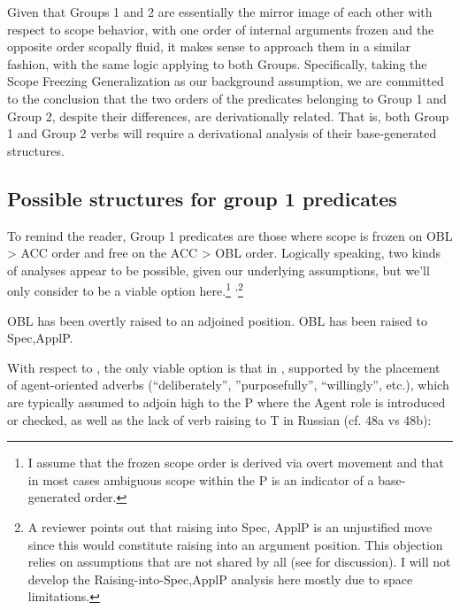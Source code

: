 \documentclass[output=paper,colorlinks,citecolor=brown,modfonts,nonflat]{langsci/langscibook}
\begin{document}
Given that Groups 1 and 2 are essentially the mirror image of each other with respect to scope behavior, with one order of internal arguments frozen and the opposite order scopally fluid, it makes sense to approach them in a similar fashion, with the same logic applying to both Groups. Specifically, taking the Scope Freezing Generalization as our background assumption, we are committed to the conclusion that the two orders of the predicates belonging to Group 1 and Group 2, despite their differences, are derivationally related. That is, both Group 1 and Group 2 verbs will require a derivational analysis of their base-generated structures.

\subsection{Possible structures for group 1 predicates}\label{sec:antonyuk:4.1}

To remind the reader, Group 1 predicates are those where scope is frozen on OBL > ACC order and free on the ACC > OBL order. Logically speaking, two kinds of analyses appear to be possible, given our underlying assumptions, but we’ll only consider  to be a viable option here.\footnote{I assume that the frozen scope order is derived via overt movement and that in most cases ambiguous scope within the \liv P is an indicator of a base-generated order.} \textsuperscript{,}\footnote{A reviewer points out that raising into Spec, ApplP is an unjustified move since this would constitute raising into an argument position. This objection relies on assumptions that are not shared by all (see \citealt{Larson2014} for discussion). I will not develop the Raising-into-Spec,ApplP analysis here mostly due to space limitations.}

\ea%
    \label{ex:antonyuk:47}
    \ea \label{ex:antonyuk:47a}
    OBL has been overtly raised to an adjoined position.
    \ex \label{ex:antonyuk:47b}
    OBL has been raised to Spec,ApplP.
    \z
\z

With respect to , the only viable option is that in , supported by the placement of agent-oriented adverbs (“deliberately”, ”purposefully”, “willingly”, etc.), which are typically assumed to adjoin high to the \liv P where the Agent role is introduced or checked, as well as the lack of verb raising to T in Russian (cf. 48a vs 48b):
\end{document}
